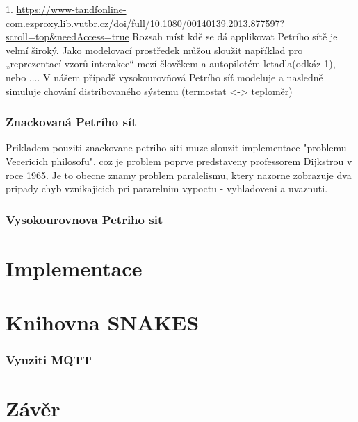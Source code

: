 1. \url{https://www-tandfonline-com.ezproxy.lib.vutbr.cz/doi/full/10.1080/00140139.2013.877597?scroll=top&needAccess=true}
Rozsah míst kdě se dá applikovat Petrího sítě je velmí široký. Jako modelovací prostředek můžou sloužit například pro „reprezentací vzorů interakce“ mezí člověkem a autopilotém letadla(odkáz 1), nebo .... V nášem případě vysokourovňová Petrího síť modeluje a nasledně simuluje chování distribovaného sýstemu (termostat <-> teploměr) 

\subsection*{Znackovaná Petrího sít}
Prikladem pouziti znackovane petriho siti muze slouzit implementace "problemu Vecericich philosofu", coz je problem poprve predstaveny professorem Dijkstrou v roce 1965.
Je to obecne znamy problem paralelismu, ktery nazorne zobrazuje dva pripady chyb vznikajicich pri pararelnim vypoctu - vyhladoveni a uvaznuti.
\subsection*{Vysokourovnova Petriho sit}
\chapter{Implementace}
\chapter{Knihovna SNAKES}
\subsection*{Vyuziti MQTT}
\chapter{Závěr}
\label{zaver}
